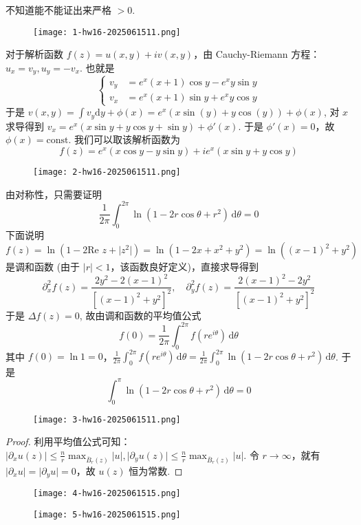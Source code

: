 \begin{note}
不知道能不能证出来严格 $>0$.
\end{note}
\begin{exercise}
\begin{figure}[H]
\centering
\texttt{[image: 1-hw16-2025061511.png]}
\label{}
\end{figure}
\end{exercise}
对于解析函数 $f (z)=u (x, y)+i v(x,y)$，由 Cauchy-Riemann 方程：$u_{x}=v_{y},u_{y}=-v_{x}$. 也就是
\[
\begin{cases}
v_{y} & =e^{ x }(x+1)\cos y-e^{ x }y\sin y \\
v_{x} & =e^{ x }(x+1)\sin y +e^{ x }y\cos y
\end{cases}
\]
于是 $v(x,y)=\int v_{y}\mathrm{d}y+\phi(x)=e^x (x \sin (y)+y \cos (y))+\phi (x)$, 对 $x$ 求导得到 $v_{x}=e^{ x }(x\sin y+y\cos y+\sin y)+\phi'(x)$. 于是 $\phi'(x)=0$，故 $\phi(x)=\text{const}$. 我们可以取该解析函数为
\[
f(z)=e^{ x }(x\cos y-y\sin y)+ie^{ x }(x\sin y+y\cos y)
\]
\begin{exercise}
\begin{figure}[H]
\centering
\texttt{[image: 2-hw16-2025061511.png]}
\label{}
\end{figure}
\end{exercise}
由对称性，只需要证明
\[
\frac{1}{2\pi}\int_{0}^{2\pi}\ln (1-2r\cos\theta+r^{2}) \, \mathrm{d}\theta=0
\]
下面说明 $f(z)=\ln(1-2\text{Re }z+\lvert z^{2} \rvert)=\ln(1-2x+x^{2}+y^{2})=\ln((x-1)^{2}+y^{2})$ 是调和函数 (由于 $\lvert r \rvert<1$，该函数良好定义)，直接求导得到
\[
\partial _{x}^{2}f(z)=\frac{2y^{2}-2(x-1)^{2}}{[(x-1)^{2}+y^{2}]^{2}},\quad \partial _{y}^{2}f(z)=\frac{2(x-1)^{2}-2y^{2}}{[(x-1)^{2}+y^{2}]^{2}}
\]
于是 $\Delta f(z)=0$, 故由调和函数的平均值公式
\[
f(0)=\frac{1}{2\pi}\int_{0}^{2\pi} f(re^{ i\theta }) \, \mathrm{d}\theta
\]
其中 $f(0)=\ln1=0$，$\frac{1}{2\pi}\int_{0}^{2\pi} f(re^{ i\theta }) \, \mathrm{d}\theta=\frac{1}{2\pi}\int_{0}^{2\pi} \ln(1-2r\cos\theta+r^{2}) \, \mathrm{d}\theta$. 于是
\[
\int_{0}^{\pi} \ln(1-2r\cos\theta+r^{2}) \, \mathrm{d}\theta=0
\]
\begin{exercise}
\begin{figure}[H]
\centering
\texttt{[image: 3-hw16-2025061511.png]}
\label{}
\end{figure}
\end{exercise}
\begin{proof}
利用平均值公式可知：$\lvert \partial_{x}u(z) \rvert\leq\frac{n}{r}\max_{\overline{B}_{r}(z)}\lvert u \rvert,\lvert \partial_{y}u(z) \rvert\leq\frac{n}{r}\max_{\overline{B}_{r}(z)}\lvert u \rvert$. 令 $r\to \infty$，就有 $\lvert \partial_{x}u \rvert=\lvert \partial_{y}u \rvert=0$，故 $u(z)$ 恒为常数.
\end{proof}
\begin{figure}[H]
\centering
\texttt{[image: 4-hw16-2025061515.png]}
\label{}
\end{figure}
\begin{figure}[H]
\centering
\texttt{[image: 5-hw16-2025061515.png]}
\label{}
\end{figure}

